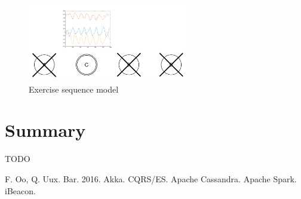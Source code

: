 \documentclass[a4paper, 10 pt, conference]{IEEEtran}
\begin{document}
\begin{figure}[hb]
	\begin{center}
		\caption{Exercise sequence model}
		\label{fig:model-sequence+setup}
		\includegraphics[width=7cm,keepaspectratio]{ri-model-sequence+setup.png}
	\end{center}
\end{figure}

\section{Summary}

TODO

\addtolength{\textheight}{-12cm}  %

\begin{thebibliography}{99}

 F. Oo, Q. Uux. Bar. 2016.
 Akka.
 CQRS/ES.
 Apache Cassandra.
 Apache Spark.
 iBeacon.

\end{thebibliography}
\end{document}
